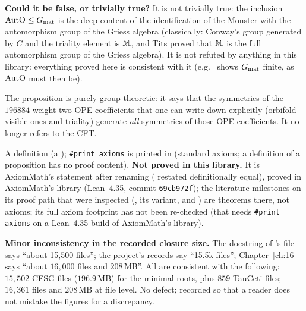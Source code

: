 \begin{dictionary}
\textbf{Could it be false, or trivially true?}  It is not trivially true: the inclusion $\mathrm{AutO}\le G_{\mathrm{mat}}$
is the deep content of the identification of the Monster with the automorphism group of the Griess algebra (classically:
Conway's group generated by $C$ and the triality element is $\mathbb{M}$, and Tits proved that $\mathbb{M}$ is the full
automorphism group of the Griess algebra).  It is not refuted by anything in this library: everything proved here is
consistent with it (e.g.\  shows $G_{\mathrm{mat}}$ finite, as $\mathrm{AutO}$ must then be).
\end{dictionary}

\begin{physics}
The proposition is purely group-theoretic: it says that the symmetries of the $196884$ weight-two OPE coefficients that one can
write down explicitly (orbifold-visible ones and triality) generate \emph{all} symmetries of those OPE coefficients.  It no
longer refers to the CFT.
\end{physics}

\begin{status}
A definition (a ); \texttt{\#print axioms}  is printed in
 (standard axioms; a definition of a proposition has no proof content).
\textbf{Not proved in this library.}  It is AxiomMath's statement after renaming ( restated definitionally equal),
proved in AxiomMath's library (Lean~4.35, commit \texttt{69cb972f}); the literature milestones on its proof path that were
inspected (, its  variant, and
) are theorems there, not axioms; its full axiom footprint has not been
re-checked (that needs \texttt{\#print axioms} on a Lean~4.35 build of AxiomMath's library).
\end{status}

\begin{warning}
\textbf{Minor inconsistency in the recorded closure size.}  The docstring of 's file says ``about 15,500
files''; the project's records say ``15.5k files''; Chapter~\ref{ch:16} says ``about $16{,}000$ files and $208$\,MB''.  All are
consistent with the following: $15{,}502$ CFSG files ($196.9$\,MB) for the minimal roots, plus $859$ TauCeti
files; $16{,}361$ files and $208$\,MB at file level.  No defect; recorded so that a reader does not mistake the figures for a
discrepancy.
\end{warning}

